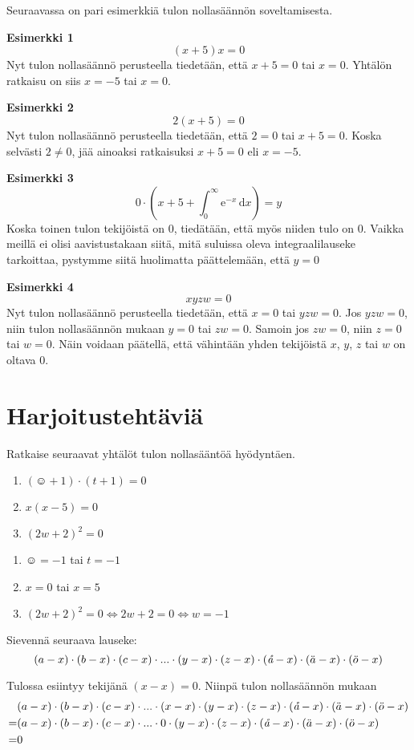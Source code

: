 Seuraavassa on pari esimerkkiä tulon nollasäännön soveltamisesta.

\textbf{Esimerkki 1}
\[(x+5)x=0\]
Nyt tulon nollasäännö perusteella tiedetään, että $x+5=0$ tai $x=0$. Yhtälön ratkaisu on siis $x=-5$ tai $x=0$.

\textbf{Esimerkki 2}
\[2(x+5)=0\]
Nyt tulon nollasäännö perusteella tiedetään, että $2=0$ tai $x+5=0$.
Koska selvästi $2\neq 0$, jää ainoaksi ratkaisuksi $x+5=0$ eli $x=-5$.

\textbf{Esimerkki 3}
\[0\cdot(x+5+\int_0^\infty \mathrm{e}^{-x}\,\mathrm{d}x)=y\]
Koska toinen tulon tekijöistä on $0$, tiedätään, että myös niiden tulo on $0$.
Vaikka meillä ei olisi aavistustakaan siitä, mitä suluissa oleva integraalilauseke tarkoittaa,
pystymme siitä huolimatta päättelemään, että $y=0$

\textbf{Esimerkki 4}
\[xyzw=0\]
Nyt tulon nollasäännö perusteella tiedetään, että $x=0$ tai $yzw=0$. Jos $yzw=0$, niin tulon nollasäännön mukaan
$y=0$ tai $zw=0$. Samoin jos $zw=0$, niin $z=0$ tai $w=0$. Näin voidaan päätellä, että
vähintään yhden tekijöistä $x$, $y$, $z$ tai $w$ on oltava $0$.

\section{Harjoitustehtäviä}
\begin{tehtava}
    Ratkaise seuraavat yhtälöt tulon nollasääntöä hyödyntäen.
    \begin{enumerate}
        \item $(\smiley{}+1)\cdot (t+1)=0$
        \item $x(x-5)=0$
        \item $(2w+2)^2=0$
    \end{enumerate}
    \begin{vastaus}
        \begin{enumerate}
            \item $\smiley{}=-1$ tai $t=-1$
            \item $x=0$ tai $x=5$
            \item $(2w+2)^2=0 \Leftrightarrow 2w+2=0 \Leftrightarrow w=-1$
        \end{enumerate}
    \end{vastaus}
\end{tehtava}

\begin{tehtava}
	Sievennä seuraava lauseke:
	\[(a-x)\cdot(b-x)\cdot(c-x)\cdot...\cdot(y-x)\cdot(z-x)\cdot(\text{\it å}-x)\cdot(\ddot{a}-x)\cdot(\ddot{o}-x)\]
    \begin{vastaus}
		Tulossa esiintyy tekijänä $(x-x)=0$. Niinpä tulon nollasäännön mukaan
		\begin{align*}
 			&(a-x)\cdot(b-x)\cdot(c-x)\cdot...\cdot(x-x)\cdot(y-x)\cdot(z-x)\cdot(\text{\it å}-x)\cdot(\ddot{a}-x)\cdot(\ddot{o}-x) \\
 			=&(a-x)\cdot(b-x)\cdot(c-x)\cdot...\cdot 0\cdot(y-x)\cdot(z-x)\cdot(\text{\it å}-x)\cdot(\ddot{a}-x)\cdot(\ddot{o}-x) \\
 			=&0
		\end{align*}
   \end{vastaus}
\end{tehtava}
